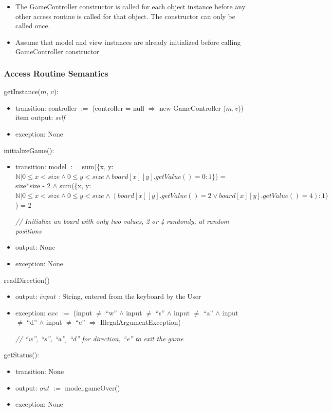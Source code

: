 \documentclass[12pt]{article}
\begin{document}
\begin{itemize}
\item The GameController constructor is called for each object instance before any other access routine is called for that object.  The constructor can only be called once.
\item Assume that model and view instances are already initialized before calling GameController constructor
\end{itemize}

\subsubsection* {Access Routine Semantics}

getInstance($m$, $v$):
\begin{itemize}
\item transition: controller $:=$ (controller = null $\Rightarrow$ new GameController ($m, v$))
item output: \textit{self}
\item exception: None
\end{itemize}

\noindent initializeGame():
\begin{itemize}
\item transition: model $:=$ sum(\{x, y: $\mathbb{N} | 0 \leq x < size \land 0 \leq y < size \land board[x][y].getValue() = 0: 1\}$) = size*size - 2 $\land$ sum(\{x, y: $\mathbb{N} | 0 \leq x < size \land 0 \leq y < size \land (board[x][y].getValue() = 2 \lor board[x][y].getValue() = 4): 1\}$) = 2

\textit{// Initialize an board with only two values, 2 or 4 randomly, at random positions}
\item output: None
\item exception: None
\end{itemize}

\noindent readDirection()
\begin{itemize}
\item output: $input$ : String, entered from the keyboard by the User
\item exception: $exc$ $:=$ (input $\neq$ ``w'' $\wedge$ input $\neq$ ``s'' $\wedge$ input $\neq$ ``a'' $\wedge$ input $\neq$ ``d'' $\wedge$ input $\neq$ ``e'' $\Rightarrow$ IllegalArgumentException)

\textit{// ``w'', ``s'', ``a'', ``d'' for direction, ``e'' to exit the game}
\end{itemize}

\noindent getStatus():
\begin{itemize}
\item transition: None
\item output: $out$ $:=$ model.gameOver()
\item exception: None
\end{itemize}
\end{document}
